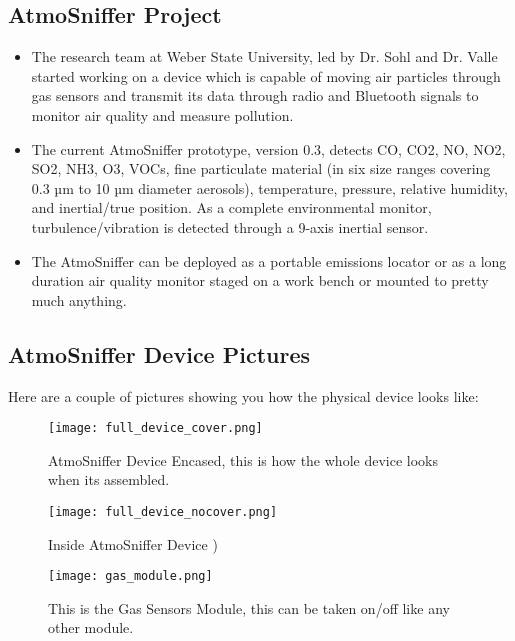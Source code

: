 \subsection{AtmoSniffer Project}
\begin{itemize}
\item The research team at Weber State University, led by Dr. Sohl and Dr. Valle started working on a device which is capable of moving air particles through gas sensors and transmit its data through radio and Bluetooth signals to monitor air quality and measure pollution. \cite{weber}

\item The current AtmoSniffer prototype, version 0.3, detects CO, CO2, NO, NO2, SO2, NH3, O3, VOCs, fine particulate material (in six size ranges covering 0.3 µm to 10 µm diameter aerosols), temperature, pressure, relative humidity, and inertial/true position. As a complete environmental monitor, turbulence/vibration is detected through a 9-axis inertial sensor. \cite{weber}

\item The AtmoSniffer can be deployed as a portable emissions locator or as a long duration air quality monitor staged on a work bench or mounted to pretty much anything.
\end{itemize}

\subsection{AtmoSniffer Device Pictures}
Here are a couple of pictures showing you how the physical device looks like:

\begin{figure}[h]
\centering
\texttt{[image: full\_device\_cover.png]}
 \caption{AtmoSniffer Device Encased, this is how the whole device looks when its assembled. \cite{weber}}
 \label{fig:encased_device}
\end{figure}

\begin{figure}[h]
\centering
\texttt{[image: full\_device\_nocover.png]}
 \caption{Inside AtmoSniffer Device \cite{weber})}
 \label{fig:inside_device}
\end{figure}

\begin{figure}[h]
\centering
\texttt{[image: gas\_module.png]}
 \caption{This is the Gas Sensors Module, this can be taken on/off like any other module.\cite{weber}}
 \label{fig:gas_sensors}
\end{figure}

